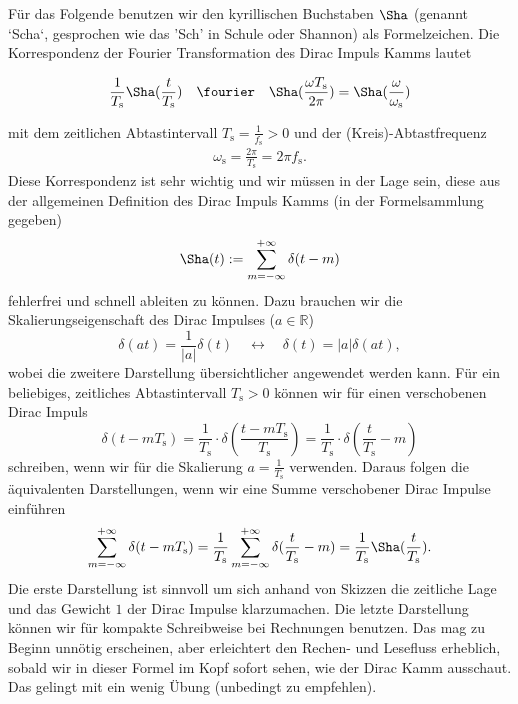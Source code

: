 Für das Folgende benutzen wir den kyrillischen Buchstaben $\Sha$ (genannt `Scha`,
gesprochen wie das 'Sch' in Schule oder Shannon) als Formelzeichen.
%
Die Korrespondenz der Fourier Transformation des Dirac Impuls Kamms lautet
\begin{mdframed}
\begin{equation}
\frac{1}{T_\mathrm{s}} {\Sha}(\frac{t}{T_\mathrm{s}}) \quad\fourier\quad
{\Sha}(\frac{\omega T_\mathrm{s}}{2 \pi}) =
\Sha(\frac{\omega}{\omega_\mathrm{s}})
\end{equation}
\end{mdframed}
mit dem zeitlichen Abtastintervall $T_\mathrm{s} = \frac{1}{f_\mathrm{s}}>0$
und der (Kreis)-Abtastfrequenz
\begin{align}
\omega_\mathrm{s} = \frac{2 \pi}{T_\mathrm{s}}  = 2 \pi f_\mathrm{s}.
\end{align}
%
Diese Korrespondenz ist sehr wichtig und wir müssen in der Lage sein, diese
aus der allgemeinen Definition des Dirac Impuls Kamms (in der Formelsammlung gegeben)
\begin{equation}
{\Sha}(t) := \sum_{m=-\infty}^{+\infty} \delta(t-m)%
\end{equation}
fehlerfrei und schnell ableiten zu können.
%
Dazu brauchen wir die Skalierungseigenschaft des Dirac Impulses ($a\in\mathbb{R}$)
\begin{equation}
\delta(a t) = \frac{1}{|a|} \delta(t) \quad\longleftrightarrow\quad
\delta(t) = |a| \delta(a t),
\end{equation}
wobei die zweitere Darstellung übersichtlicher angewendet werden kann.
%
Für ein beliebiges, zeitliches Abtastintervall $T_\mathrm{s}>0$ können wir
für einen verschobenen Dirac Impuls
\begin{equation}
\delta(t - m T_\mathrm{s}) =
\frac{1}{T_\mathrm{s}}\cdot \delta(\frac{t - m T_\mathrm{s}}{T_\mathrm{s}}) =
\frac{1}{T_\mathrm{s}} \cdot \delta(\frac{t}{T_\mathrm{s}}-m)
\end{equation}
schreiben, wenn wir für die Skalierung $a=\frac{1}{T_\mathrm{s}}$ verwenden.
%
Daraus folgen die äquivalenten Darstellungen, wenn wir eine Summe
verschobener Dirac Impulse einführen
\begin{equation}
\sum_{m=-\infty}^{+\infty} \delta(t-m T_\mathrm{s}) =
\frac{1}{T_\mathrm{s}}\sum_{m=-\infty}^{+\infty} \delta(\frac{t}{T_\mathrm{s}}-m) =
\frac{1}{T_\mathrm{s}} {\Sha}(\frac{t}{T_\mathrm{s}}).
\end{equation}
Die erste Darstellung ist sinnvoll um sich anhand von Skizzen die zeitliche
Lage und das Gewicht $1$ der Dirac Impulse klarzumachen. Die letzte
Darstellung können wir für kompakte Schreibweise bei Rechnungen benutzen. Das
mag zu Beginn unnötig erscheinen, aber erleichtert den Rechen- und Lesefluss
erheblich, sobald wir in dieser Formel im Kopf sofort sehen, wie der Dirac Kamm
ausschaut. Das gelingt mit ein wenig Übung (unbedingt zu empfehlen).

